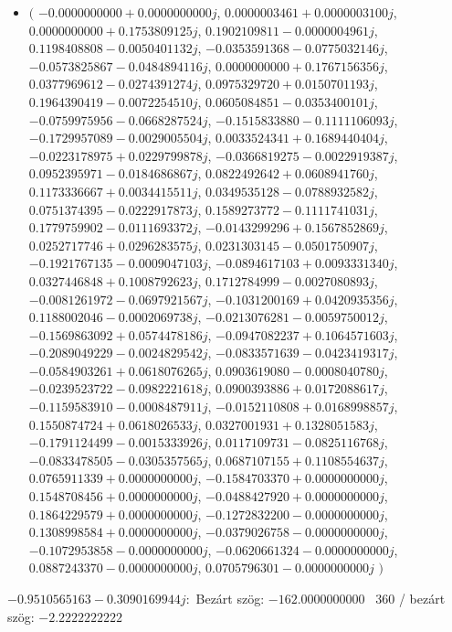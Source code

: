 \documentclass[14pt,a4paper]{article}
\begin{document}
\begin{itemize}
\item
$\big($
$-0.0000000000+0.0000000000j$, $0.0000003461+0.0000003100j$, $0.0000000000+0.1753809125j$, $0.1902109811-0.0000004961j$, $0.1198408808-0.0050401132j$, $-0.0353591368-0.0775032146j$, $-0.0573825867-0.0484894116j$, $0.0000000000+0.1767156356j$, $0.0377969612-0.0274391274j$, $0.0975329720+0.0150701193j$, $0.1964390419-0.0072254510j$, $0.0605084851-0.0353400101j$, $-0.0759975956-0.0668287524j$, $-0.1515833880-0.1111106093j$, $-0.1729957089-0.0029005504j$, $0.0033524341+0.1689440404j$, $-0.0223178975+0.0229799878j$, $-0.0366819275-0.0022919387j$, $0.0952395971-0.0184686867j$, $0.0822492642+0.0608941760j$, $0.1173336667+0.0034415511j$, $0.0349535128-0.0788932582j$, $0.0751374395-0.0222917873j$, $0.1589273772-0.1111741031j$, $0.1779759902-0.0111693372j$, $-0.0143299296+0.1567852869j$, $0.0252717746+0.0296283575j$, $0.0231303145-0.0501750907j$, $-0.1921767135-0.0009047103j$, $-0.0894617103+0.0093331340j$, $0.0327446848+0.1008792623j$, $0.1712784999-0.0027080893j$, $-0.0081261972-0.0697921567j$, $-0.1031200169+0.0420935356j$, $0.1188002046-0.0002069738j$, $-0.0213076281-0.0059750012j$, $-0.1569863092+0.0574478186j$, $-0.0947082237+0.1064571603j$, $-0.2089049229-0.0024829542j$, $-0.0833571639-0.0423419317j$, $-0.0584903261+0.0618076265j$, $0.0903619080-0.0008040780j$, $-0.0239523722-0.0982221618j$, $0.0900393886+0.0172088617j$, $-0.1159583910-0.0008487911j$, $-0.0152110808+0.0168998857j$, $0.1550874724+0.0618026533j$, $0.0327001931+0.1328051583j$, $-0.1791124499-0.0015333926j$, $0.0117109731-0.0825116768j$, $-0.0833478505-0.0305357565j$, $0.0687107155+0.1108554637j$, $0.0765911339+0.0000000000j$, $-0.1584703370+0.0000000000j$, $0.1548708456+0.0000000000j$, $-0.0488427920+0.0000000000j$, $0.1864229579+0.0000000000j$, $-0.1272832200-0.0000000000j$, $0.1308998584+0.0000000000j$, $-0.0379026758-0.0000000000j$, $-0.1072953858-0.0000000000j$, $-0.0620661324-0.0000000000j$, $0.0887243370-0.0000000000j$, $0.0705796301-0.0000000000j$
$\big)$
\end{itemize}
$-0.9510565163-0.3090169944j$:\
Bezárt szög: $-162.0000000000$ \
360 / bezárt szög: $-2.2222222222$\
\end{document}
